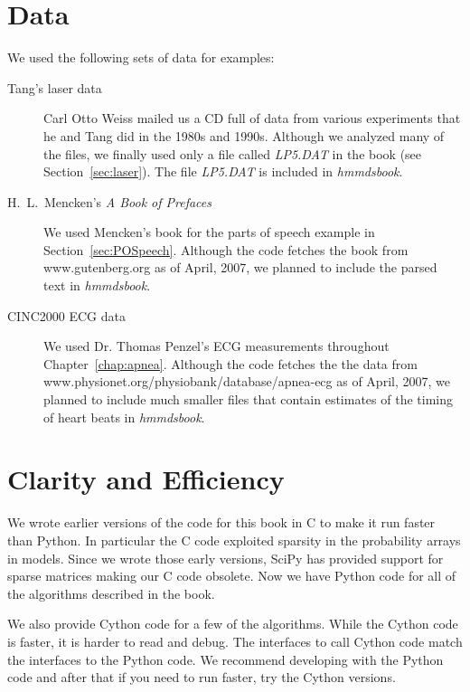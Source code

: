 \section{Data}
\label{sec:SWdata}

We used the following sets of data for examples:
\begin{description}
\item[Tang's laser data] Carl Otto Weiss  mailed
  us a CD full of data from various experiments that he and Tang did
  in the 1980s and 1990s.  Although we analyzed many of the files, we
  finally used only a file called \emph{LP5.DAT} in the book (see
  Section~\ref{sec:laser}).  The file \emph{LP5.DAT} is included in
  \emph{hmmdsbook}.
\item[H.~L.~Mencken's \emph{A Book of Prefaces}] We used Mencken's
  book for the parts of speech example in Section~\ref{sec:POSpeech}.
  Although the code fetches the book from www.gutenberg.org as of
  April, 2007, we planned to include the parsed text in
  \emph{hmmdsbook}.
\item[CINC2000 ECG data] We used Dr. Thomas Penzel's ECG measurements
  throughout Chapter~\ref{chap:apnea}.  Although the code fetches the
  the data from\\
  www.physionet.org/physiobank/database/apnea-ecg as of April, 2007,
  we planned to include much smaller files that contain estimates of
  the timing of heart beats in \emph{hmmdsbook}.
\end{description}

\section{Clarity and Efficiency}
\label{sec:Clarity}

We wrote earlier versions of the code for this book in C to make it
run faster than Python.  In particular the C code exploited sparsity
in the probability arrays in models.  Since we wrote those early
versions, SciPy has provided support for sparse matrices making our C
code obsolete.  Now we have Python code for all of the algorithms
described in the book.

We also provide Cython code for a few of the algorithms.  While the
Cython code is faster, it is harder to read and debug.  The interfaces
to call Cython code match the interfaces to the Python code.  We
recommend developing with the Python code and after that if you need
to run faster, try the Cython versions.

